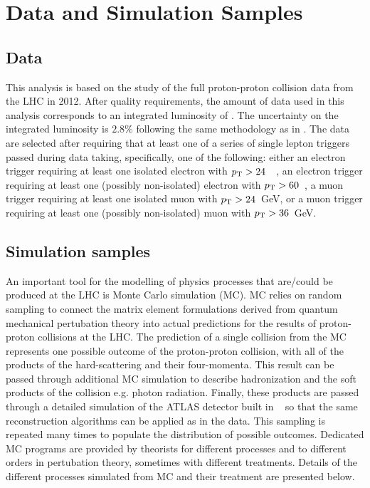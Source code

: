 \section{Data and Simulation Samples}
\subsection{Data}
\label{sec:subsection_data}



This analysis is based on the study of the full proton-proton collision
data from the LHC in 2012. After quality requirements, the amount 
of data used in this analysis corresponds to 
an integrated luminosity of \lumi.
The uncertainty on the integrated luminosity is $2.8\%$ 
following the same methodology as in \cite{Aad:2013ucp}.
The data are selected after requiring that at least one
of a series of single lepton triggers passed during data taking, 
specifically, one of the following:
either an electron trigger 
requiring at least one isolated
electron with $p_{\mathrm{T}}>24$~\GeV~, an electron trigger requiring
at least one (possibly non-isolated) electron 
with $p_{\mathrm{T}}>60$~\GeV, a muon 
trigger requiring at least one isolated muon with $p_{\mathrm{T}}>24$~GeV,
or a muon trigger requiring at least one 
(possibly non-isolated) muon with $p_{\mathrm{T}}>36$~GeV.


\subsection{Simulation samples}

An important tool for the modelling of physics processes
that are/could be produced at the LHC is Monte Carlo simulation (MC).
MC relies on random sampling to connect the matrix element formulations
derived from quantum mechanical pertubation theory into 
actual predictions for the results of proton-proton collisions
at the LHC.
The prediction of a single collision from the MC represents
one possible outcome of the proton-proton collision, with all of the 
products of the hard-scattering and their four-momenta.
This result can be passed through additional MC simulation to describe
hadronization and the soft products of the collision e.g. photon radiation.
Finally, these products are passed through a detailed 
simulation of the ATLAS detector built in \geant~\cite{Agostinelli:2002hh}
so that the same reconstruction algorithms
can be applied as in the data.
This sampling is repeated many times to populate the 
distribution of possible
outcomes. Dedicated MC programs are provided by theorists for 
different processes and to different orders in pertubation theory,
sometimes with different treatments.
Details of the different processes simulated from MC and their
treatment are presented below.





\newpage




